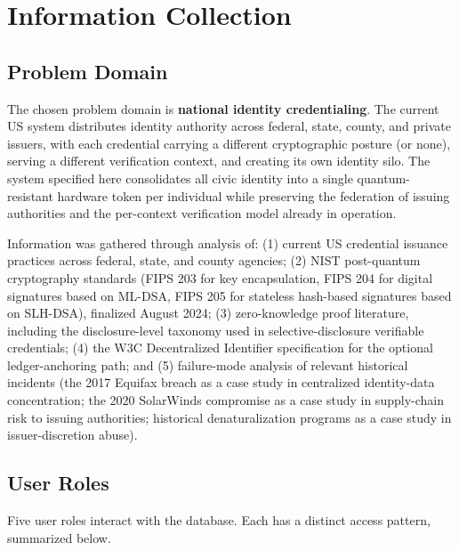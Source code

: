 \documentclass[11pt,letterpaper]{article}
\begin{document}
\section{Information Collection}
\label{sec:info-collection}

\subsection{Problem Domain}

The chosen problem domain is \textbf{national identity credentialing}. The current US system distributes identity authority across federal, state, county, and private issuers, with each credential carrying a different cryptographic posture (or none), serving a different verification context, and creating its own identity silo. The system specified here consolidates all civic identity into a single quantum-resistant hardware token per individual while preserving the federation of issuing authorities and the per-context verification model already in operation.

Information was gathered through analysis of: (1) current US credential issuance practices across federal, state, and county agencies; (2) NIST post-quantum cryptography standards (FIPS 203 for key encapsulation, FIPS 204 for digital signatures based on ML-DSA, FIPS 205 for stateless hash-based signatures based on SLH-DSA), finalized August 2024; (3) zero-knowledge proof literature, including the disclosure-level taxonomy used in selective-disclosure verifiable credentials; (4) the W3C Decentralized Identifier specification for the optional ledger-anchoring path; and (5) failure-mode analysis of relevant historical incidents (the 2017 Equifax breach as a case study in centralized identity-data concentration; the 2020 SolarWinds compromise as a case study in supply-chain risk to issuing authorities; historical denaturalization programs as a case study in issuer-discretion abuse).

\subsection{User Roles}

Five user roles interact with the database. Each has a distinct access pattern, summarized below.
\end{document}
